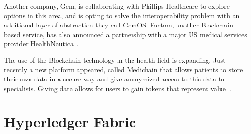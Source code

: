 Another company, Gem, is collaborating with Phillips Healthcare to explore
options in this area, and is opting to solve the interoperability problem with
an additional layer of abstraction they call GemOS.  Factom, another
Blockchain-based service, has also announced a partnership with a major US
medical services provider
HealthNautica~\cite{BlockchainCompHealth2017,FactomPartnership2017}.

The use of the Blockchain technology in the health field is expanding. Just
recently a new platform appeared, called Medichain that allows patients to
store their own data in a secure way and give anonymized access to this data to
specialists. Giving data allows for users to gain tokens that represent
value~\cite{MediChain2018}.

\section{Hyperledger Fabric}
